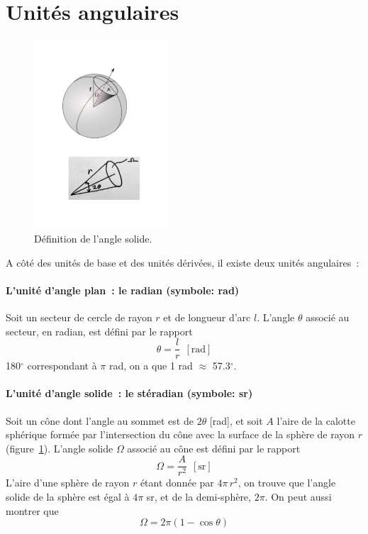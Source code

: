 \newpage

\section{Unités angulaires}

\begin{figure}
   \centering
   \includegraphics[width=5cm]{assets/figures/defAngleSolide.pdf}
   \caption{Définition de l'angle solide.}
   \label{fig:angles}
\end{figure}
A côté des unités de base et des unités dérivées, il existe deux unités angulaires~:

\paragraph{L'unité d'angle plan~: le radian (symbole: rad)} Soit un secteur de cercle de rayon $r$ et de longueur d'arc $l$. L'angle $\theta$ associé au secteur, en radian, est défini par le rapport
$$
\theta=\frac{l}{r}\ \ [\text{rad}]
$$
180$^\circ$ correspondant à $\pi$ rad, on a que 1 rad $\approx$ 57.3$^\circ$.

\paragraph{L'unité d'angle solide~: le stéradian (symbole: sr)} Soit un cône dont l'angle au sommet est de $2\theta$ [rad], et soit $A$ l'aire de la calotte sphérique formée par l'intersection du cône avec la surface de la sphère de rayon $r$ (figure~\ref{fig:angles}). L'angle solide $\Omega$ associé au cône est défini par le rapport
$$
\Omega=\frac{A}{r^2}\ \ [\text{sr}]
$$
L'aire d'une sphère de rayon $r$ étant donnée par $4\pi\,r^2$, on trouve que l'angle solide de la sphère est égal à $4\pi$ sr, et de la demi-sphère, $2\pi$. On peut aussi montrer que
$$
\Omega=2\pi(1-\cos\theta)
$$


